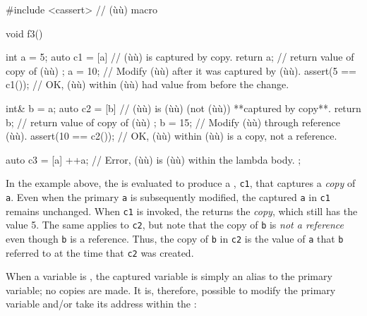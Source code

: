 \begin{emcppslisting}
#include <cassert>  // (ù{}ù) macro

void f3()
{
    int a = 5;
    auto c1 = [a]        // (ù{}ù) is captured by copy.
    {
        return a;        // return value of copy of (ù{}ù)
    };
    a = 10;              // Modify (ù{}ù) after it was captured by (ù{}ù).
    assert(5 == c1());   // OK, (ù{}ù) within (ù{}ù) had value from before the change.

    int& b = a;
    auto c2 = [b]        // (ù{}ù) is (ù{}ù) (not (ù{}ù)) **captured by copy**.
    {
        return b;        // return value of copy of (ù{}ù)
    };
    b = 15;              // Modify (ù{}ù) through reference (ù{}ù).
    assert(10 == c2());  // OK, (ù{}ù) within (ù{}ù) is a copy, not a reference.

    auto c3 = [a]
    {
        ++a;             // Error, (ù{}ù) is (ù{}ù) within the lambda body.
    };
}
\end{emcppslisting}
    

In the example above, the  is evaluated to
produce a , \lstinline!c1!, that captures a
\emph{copy} of \lstinline!a!. Even when the primary \lstinline!a! is
subsequently modified, the captured \lstinline!a! in \lstinline!c1! remains
unchanged. When \lstinline!c1! is invoked, the  returns
the \emph{copy}, which still has the value 5. The same applies to
\lstinline!c2!, but note that the copy of \lstinline!b! is \emph{not a
reference} even though \lstinline!b! is a reference. Thus, the copy of
\lstinline!b! in \lstinline!c2! is the value of \lstinline!a! that \lstinline!b!
referred to at the time that \lstinline!c2! was created.

When a variable is , the captured variable
is simply an alias to the primary variable; no copies are made. It is,
therefore, possible to modify the primary variable and/or take its
address within the :

